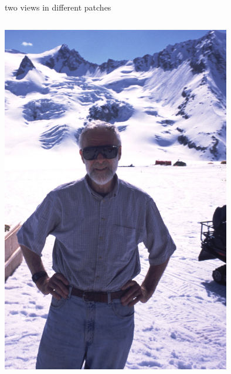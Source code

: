 \documentclass[10pt,hyperref,dvipsnames]{beamer}
\begin{document}
\begin{frame}{two views in different patches}

\begin{columns}
\begin{column}{0.25\textwidth}
\includegraphics[width=0.75\textwidth]{figs/Will-by-Truffer.jpg}


\end{column}
\end{columns}
\end{frame}
\end{document}
